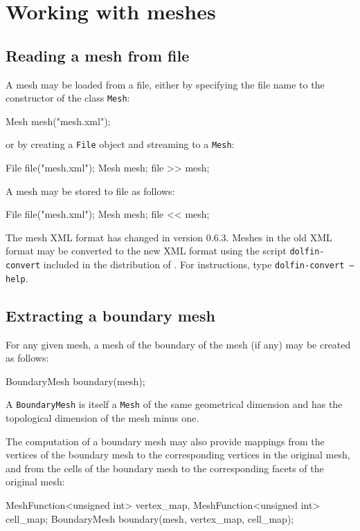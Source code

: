 \section{Working with meshes}

\subsection{Reading a mesh from file}

A mesh may be loaded from a file, either by specifying the file name
to the constructor of the class \texttt{Mesh}:
\begin{code}
Mesh mesh("mesh.xml");
\end{code}
or by creating a \texttt{File} object and streaming to a
\texttt{Mesh}:
\begin{code}
File file("mesh.xml");
Mesh mesh;
file >> mesh;
\end{code}
A mesh may be stored to file as follows:
\begin{code}
File file("mesh.xml");
Mesh mesh;
file << mesh;
\end{code}

The \dolfin{} mesh XML format has changed in \dolfin{} version
0.6.3. Meshes in the old XML format may be converted to the new XML
format using the script \texttt{dolfin-convert} included in the
distribution of \dolfin{}. For instructions, type
\texttt{dolfin-convert --help}.

\subsection{Extracting a boundary mesh}

For any given mesh, a mesh of the boundary of the mesh (if any) may be
created as follows:
\begin{code}
BoundaryMesh boundary(mesh);
\end{code}
A \texttt{BoundaryMesh} is itself a \texttt{Mesh} of the same
geometrical dimension and has the topological dimension of the mesh
minus one.

The computation of a boundary mesh may also provide mappings from the
vertices of the boundary mesh to the corresponding vertices in the
original mesh, and from the cells of the boundary mesh to the
corresponding facets of the original mesh:
\begin{code}
MeshFunction<unsigned int> vertex_map,
MeshFunction<unsigned int> cell_map;
BoundaryMesh boundary(mesh, vertex_map, cell_map);
\end{code}

